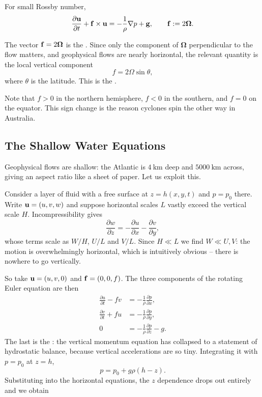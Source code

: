 \documentclass[a4paper]{scrartcl}
\newcommand{\pd}[2]{\frac{\partial #1}{\partial #2}}
\newcommand{\bOm}{\boldsymbol{\Omega}}
\begin{document}
\begin{proposition}
	For small Rossby number,
	$$
	\pd{\vv u}{t} + \vv f \times \vv u = -\frac{1}{\rho}\nabla p + \vv g, \qquad \vv f := 2\bOm.
	$$
\end{proposition}

\begin{definition}
	The vector $\vv f = 2\bOm$ is the . Since only the component of $\bOm$ perpendicular to the flow matters, and geophysical flows are nearly horizontal, the relevant quantity is the local vertical component
	$$
	f = 2\Omega\sin\theta,
	$$
	where $\theta$ is the latitude. This is the .
\end{definition}

Note that $f > 0$ in the northern hemisphere, $f < 0$ in the southern, and $f = 0$ on the equator. This sign change is the reason cyclones spin the other way in Australia.

\subsection{The Shallow Water Equations}

Geophysical flows are shallow: the Atlantic is $\SI{4}{\kilo\meter}$ deep and $\SI{5000}{\kilo\meter}$ across, giving an aspect ratio like a sheet of paper. Let us exploit this.

Consider a layer of fluid with a free surface at $z = h(x, y, t)$ and $p = p_0$ there. Write $\mathbf{u} = (u, v, w)$ and suppose horizontal scales $L$ vastly exceed the vertical scale $H$. Incompressibility gives
$$
\pd{w}{z} = -\pd{u}{x} - \pd{v}{y},
$$
whose terms scale as $W/H$, $U/L$ and $V/L$. Since $H \ll L$ we find $W \ll U, V$: the motion is overwhelmingly horizontal, which is intuitively obvious -- there is nowhere to go vertically.

So take $\mathbf{u} = (u, v, 0)$ and $\mathbf{f} = (0, 0, f)$. The three components of the rotating Euler equation are then
\begin{align*}
	\pd{u}{t} - fv &= -\frac{1}{\rho}\pd{p}{x}, \\
	\pd{v}{t} + fu &= -\frac{1}{\rho}\pd{p}{y}, \\
	0 &= -\frac{1}{\rho}\pd{p}{z} - g.
\end{align*}
The last is the : the vertical momentum equation has collapsed to a statement of hydrostatic balance, because vertical accelerations are so tiny. Integrating it with $p = p_0$ at $z = h$,
$$
p = p_0 + g\rho(h - z).
$$
Substituting into the horizontal equations, the $z$ dependence drops out entirely and we obtain
\end{document}
